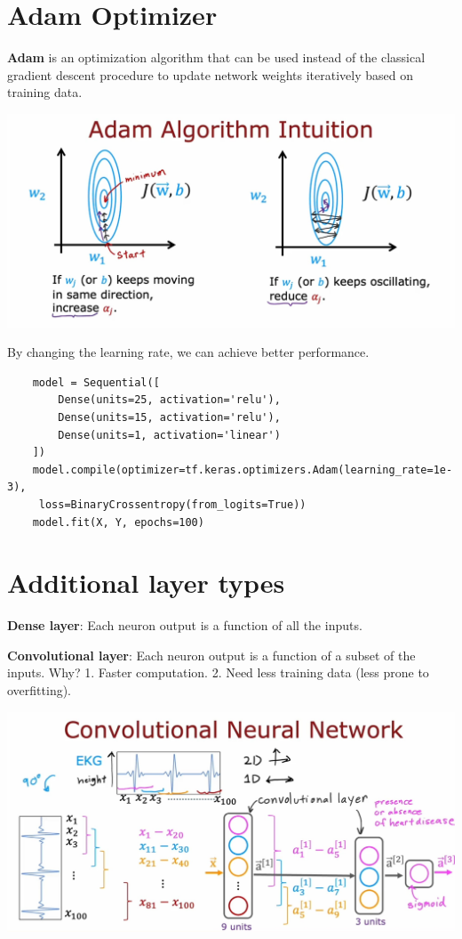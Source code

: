 \section{Adam Optimizer}
\textbf{Adam} is an optimization algorithm that can be used instead of the classical 
gradient descent procedure to update network weights iteratively based on training data.\par
\includegraphics*[width=\textwidth]{images/9.2}\par
By changing the learning rate, we can achieve better performance.\par
\begin{verbatim}
    model = Sequential([
        Dense(units=25, activation='relu'),
        Dense(units=15, activation='relu'),
        Dense(units=1, activation='linear')
    ])
    model.compile(optimizer=tf.keras.optimizers.Adam(learning_rate=1e-3),
     loss=BinaryCrossentropy(from_logits=True))
    model.fit(X, Y, epochs=100)
\end{verbatim}

\section{Additional layer types}
\textbf{Dense layer}: Each neuron output is a function of all the inputs.\par
\textbf{Convolutional layer}: Each neuron output is a function of a subset of the inputs.
Why? 1. Faster computation. 2. Need less training data (less prone to overfitting).\par
\includegraphics*[width=\textwidth]{images/9.3}

